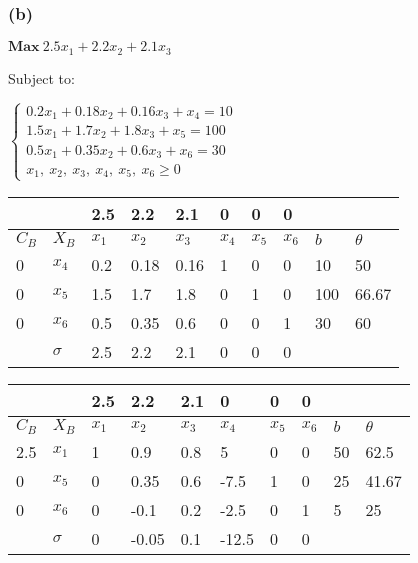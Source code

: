\documentclass{article}
\begin{document}
\subsubsection*{(b)}
$\textbf{Max} \  2.5x_{1}+2.2x_{2}+2.1x_{3}$\par
Subject to:\par\indent
\par
$\begin{cases}
0.2x_{1}+0.18x_{2}+0.16x_{3}+x_{4} = 10\\
1.5x_{1}+1.7x_{2}+1.8x_{3}+x_{5} = 100\\
0.5x_{1}+0.35x_{2}+0.6x_{3}+x_{6} = 30\\
x_{1}, \ x_{2}, \ x_{3}, \ x_{4}, \ x_{5}, \ x_{6} \geq 0\end{cases}$\par\indent
\par
\begin{tabular}{|l|l|l|l|l|l|l|l|l|l|}
\hline
         &                       & 2.5      & 2.2      & 2.1      & 0        & 0        & 0        &     &                       \\ \hline
$C_{B}$ & $X_{B}$              & $x_{1}$ & $x_{2}$ & $x_{3}$ & $x_{4}$ & $x_{5}$ & $x_{6}$ & $b$   & $\theta$ \\
\hline0& $x_{4}$     & 0.2 & 0.18 & 0.16 & 1 & 0 & 0 & 10  & 50\\
\hline0& $x_{5}$     & 1.5 & 1.7  & 1.8  & 0 & 1 & 0 & 100 & 66.67\\
\hline0& $x_{6}$     & 0.5 & 0.35 & 0.6  & 0 & 0 & 1 & 30  & 60\\
\hline&$\sigma$ & 2.5 & 2.2  & 2.1  & 0 & 0 & 0 &     &\\
\hline
\end{tabular}\par\indent
\par\indent
\par
\begin{tabular}{|l|l|l|l|l|l|l|l|l|l|}
\hline
         &                       & 2.5      & 2.2      & 2.1      & 0        & 0        & 0        &     &                       \\ \hline
$C_{B}$ & $X_{B}$              & $x_{1}$ & $x_{2}$ & $x_{3}$ & $x_{4}$ & $x_{5}$ & $x_{6}$ & $b$   & $\theta$ \\
\hline2.5&$x_{1}$& 1   & 0.9   & 0.8  & 5    & 0 & 0 & 50  & 62.5\\
\hline0  &$x_{5}$& 0   & 0.35  & 0.6  & -7.5 & 1 & 0 & 25 & 41.67\\
\hline0  &$x_{6}$& 0   & -0.1  & 0.2  & -2.5 & 0 & 1 & 5  & 25\\
\hline&$\sigma$ & 0    & -0.05 & 0.1  & -12.5& 0 & 0 &     &\\
\hline
\end{tabular}\par\indent
\end{document}
